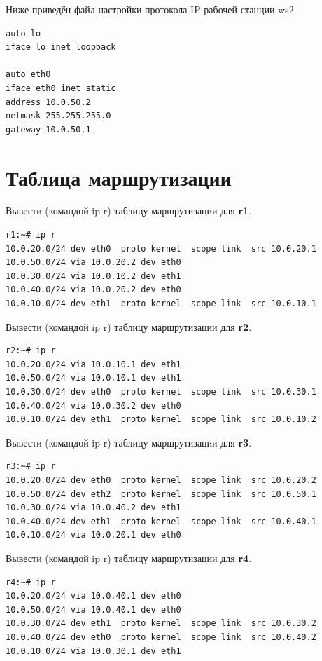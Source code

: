 \documentclass[a4paper,12pt]{article}
\begin{document}
Ниже приведён файл настройки протокола IP рабочей станции ws2.

\begin{Verbatim}
auto lo
iface lo inet loopback

auto eth0
iface eth0 inet static
address 10.0.50.2
netmask 255.255.255.0
gateway 10.0.50.1
\end{Verbatim}


\section{Таблица маршрутизации}

Вывести (командой ip r) таблицу маршрутизации для \textbf{r1}.

\begin{Verbatim}
r1:~# ip r
10.0.20.0/24 dev eth0  proto kernel  scope link  src 10.0.20.1 
10.0.50.0/24 via 10.0.20.2 dev eth0 
10.0.30.0/24 via 10.0.10.2 dev eth1 
10.0.40.0/24 via 10.0.20.2 dev eth0 
10.0.10.0/24 dev eth1  proto kernel  scope link  src 10.0.10.1
\end{Verbatim}

Вывести (командой ip r) таблицу маршрутизации для \textbf{r2}.

\begin{Verbatim}
r2:~# ip r
10.0.20.0/24 via 10.0.10.1 dev eth1 
10.0.50.0/24 via 10.0.10.1 dev eth1 
10.0.30.0/24 dev eth0  proto kernel  scope link  src 10.0.30.1 
10.0.40.0/24 via 10.0.30.2 dev eth0 
10.0.10.0/24 dev eth1  proto kernel  scope link  src 10.0.10.2 
\end{Verbatim}

Вывести (командой ip r) таблицу маршрутизации для \textbf{r3}.

\begin{Verbatim}
r3:~# ip r
10.0.20.0/24 dev eth0  proto kernel  scope link  src 10.0.20.2 
10.0.50.0/24 dev eth2  proto kernel  scope link  src 10.0.50.1 
10.0.30.0/24 via 10.0.40.2 dev eth1 
10.0.40.0/24 dev eth1  proto kernel  scope link  src 10.0.40.1 
10.0.10.0/24 via 10.0.20.1 dev eth0 
\end{Verbatim}

Вывести (командой ip r) таблицу маршрутизации для \textbf{r4}.

\begin{Verbatim}
r4:~# ip r
10.0.20.0/24 via 10.0.40.1 dev eth0 
10.0.50.0/24 via 10.0.40.1 dev eth0 
10.0.30.0/24 dev eth1  proto kernel  scope link  src 10.0.30.2 
10.0.40.0/24 dev eth0  proto kernel  scope link  src 10.0.40.2 
10.0.10.0/24 via 10.0.30.1 dev eth1 
\end{Verbatim}
\end{document}
